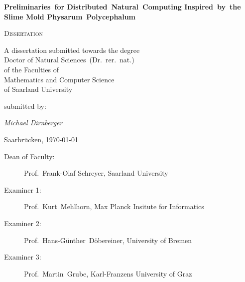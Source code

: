 
\begin{titlepage}
	\centering
	\null\vfill
	
	{\huge\bfseries Preliminaries~for Distributed~Natural~Computing Inspired~by~the Slime Mold Physarum~Polycephalum\par}
	


	\vfill

	{\scshape\Large Dissertation}
	\vfill


	{\large A dissertation submitted towards the degree\\
	Doctor of Natural Sciences~(Dr.~rer.~nat.)\\
	of the Faculties of\\
	Mathematics and Computer Science\\
	of Saarland University}


	\vfill
	submitted by:
	\vfill

	{\Large\itshape Michael Dirnberger}

	\vfill

	{\large Saarbr\"ucken, \thesisdate\today}
	\vfill
\end{titlepage}


\newpage
\thispagestyle{plain}
\null
\vfill
\begin{description}
 	\item[Dean of Faculty:] Prof.~Frank-Olaf Schreyer, Saarland University
	\item[Examiner 1:] Prof.~Kurt~Mehlhorn, Max Planck Insitute for Informatics
	\item[Examiner 2:] Prof.~Hans-G\"unther~D\"obereiner, University of Bremen
	\item[Examiner 3:] Prof.~Martin~Grube, Karl-Franzens University of Graz
\end{description}

\newpage
